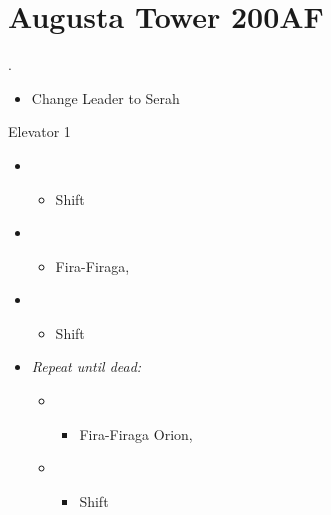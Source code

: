 \chapter{Augusta Tower 200AF}

\livet{\x}.

\begin{menu}
	\begin{itemize}
		\crystarium
		\begin{itemize}
			\item 1 \sab\ Level
			\item Max \rav
			\item \stagebonus{\sab}
		\end{itemize}
		\item Change Leader to Serah
	\end{itemize}
\end{menu}

\begin{battle}{Elevator 1}
	\begin{flushleft}
		\begin{itemize}
			\item \sixth
			      \begin{itemize}
				      \item Shift
			      \end{itemize}
			\item \second
			      \begin{itemize}
				      \item Fira-Firaga, \comb
			      \end{itemize}
			\item \first
			      \begin{itemize}
				      \item Shift
			      \end{itemize}
			\item \textit{Repeat until dead:}
			      \begin{itemize}
				      \item \sixth
				            \begin{itemize}
					            \item Fira-Firaga Orion, \comb
				            \end{itemize}
				      \item \first
				            \begin{itemize}
					            \item Shift
				            \end{itemize}
			      \end{itemize}
		\end{itemize}
	\end{flushleft}
\end{battle}

